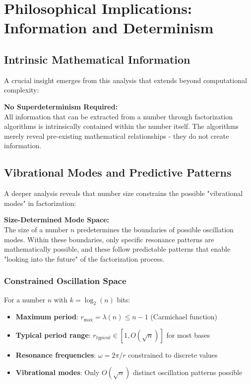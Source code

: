 \documentclass[12pt,a4paper]{article}
\begin{document}
	\section{Philosophical Implications: Information and Determinism}
	
	\subsection{Intrinsic Mathematical Information}
	
	A crucial insight emerges from this analysis that extends beyond computational complexity:
	
	\begin{tcolorbox}[colback=blue!10,colframe=blue!50,title=Fundamental Principle]
		\textbf{No Superdeterminism Required:} \\
		All information that can be extracted from a number through factorization algorithms is intrinsically contained within the number itself. The algorithms merely reveal pre-existing mathematical relationships - they do not create information.
	\end{tcolorbox}
	
	\subsection{Vibrational Modes and Predictive Patterns}
	
	A deeper analysis reveals that number size constrains the possible "vibrational modes" in factorization:
	
	\begin{tcolorbox}[colback=purple!10,colframe=purple!50,title=Vibrational Constraint Principle]
		\textbf{Size-Determined Mode Space:} \\
		The size of a number $n$ predetermines the boundaries of possible oscillation modes. Within these boundaries, only specific resonance patterns are mathematically possible, and these follow predictable patterns that enable "looking into the future" of the factorization process.
	\end{tcolorbox}
	
	\subsubsection{Constrained Oscillation Space}
	
	For a number $n$ with $k = \log_2(n)$ bits:
	
	\begin{itemize}
		\item \textbf{Maximum period}: $r_{\max} = \lambda(n) \leq n-1$ (Carmichael function)
		\item \textbf{Typical period range}: $r_{typical} \in [1, O(\sqrt{n})]$ for most bases
		\item \textbf{Resonance frequencies}: $\omega = 2\pi/r$ constrained to discrete values
		\item \textbf{Vibrational modes}: Only $O(\sqrt{n})$ distinct oscillation patterns possible
	\end{itemize}
	
\end{document}
